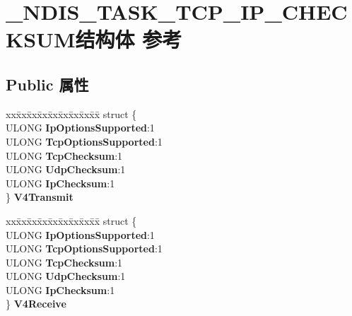 \hypertarget{struct___n_d_i_s___t_a_s_k___t_c_p___i_p___c_h_e_c_k_s_u_m}{}\section{\+\_\+\+N\+D\+I\+S\+\_\+\+T\+A\+S\+K\+\_\+\+T\+C\+P\+\_\+\+I\+P\+\_\+\+C\+H\+E\+C\+K\+S\+U\+M结构体 参考}
\label{struct___n_d_i_s___t_a_s_k___t_c_p___i_p___c_h_e_c_k_s_u_m}
\subsection*{Public 属性}
\begin{DoxyCompactItemize}
\item 
\mbox{\label{struct___n_d_i_s___t_a_s_k___t_c_p___i_p___c_h_e_c_k_s_u_m_af963d5f2f571a6b37a15940f91e14393}} 
\begin{tabbing}
xx\=xx\=xx\=xx\=xx\=xx\=xx\=xx\=xx\=\kill
struct \{\\
\>ULONG {\bfseries IpOptionsSupported}:1\\
\>ULONG {\bfseries TcpOptionsSupported}:1\\
\>ULONG {\bfseries TcpChecksum}:1\\
\>ULONG {\bfseries UdpChecksum}:1\\
\>ULONG {\bfseries IpChecksum}:1\\
\} {\bfseries V4Transmit}\\

\end{tabbing}\item 
\mbox{\label{struct___n_d_i_s___t_a_s_k___t_c_p___i_p___c_h_e_c_k_s_u_m_af00d000190e4757012e3c3ef76ae3ec7}} 
\begin{tabbing}
xx\=xx\=xx\=xx\=xx\=xx\=xx\=xx\=xx\=\kill
struct \{\\
\>ULONG {\bfseries IpOptionsSupported}:1\\
\>ULONG {\bfseries TcpOptionsSupported}:1\\
\>ULONG {\bfseries TcpChecksum}:1\\
\>ULONG {\bfseries UdpChecksum}:1\\
\>ULONG {\bfseries IpChecksum}:1\\
\} {\bfseries V4Receive}\\


\end{tabbing}
\end{DoxyCompactItemize}
